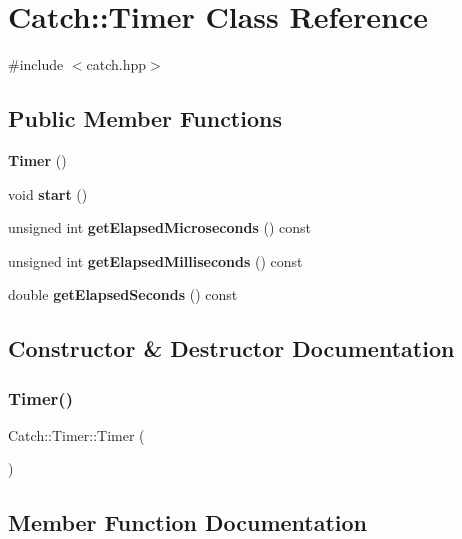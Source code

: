 \section{Catch\+:\+:Timer Class Reference}
\label{class_catch_1_1_timer}


{\ttfamily \#include $<$catch.\+hpp$>$}

\subsection*{Public Member Functions}
\begin{DoxyCompactItemize}
\item 
\textbf{ Timer} ()
\item 
void \textbf{ start} ()
\item 
unsigned int \textbf{ get\+Elapsed\+Microseconds} () const
\item 
unsigned int \textbf{ get\+Elapsed\+Milliseconds} () const
\item 
double \textbf{ get\+Elapsed\+Seconds} () const
\end{DoxyCompactItemize}


\subsection{Constructor \& Destructor Documentation}
\mbox{\label{class_catch_1_1_timer_af09b7cd7a40af71f4704262afb31558a}} 
\subsubsection{Timer()}
{\footnotesize\ttfamily Catch\+::\+Timer\+::\+Timer (\begin{DoxyParamCaption}{ }\end{DoxyParamCaption})\hspace{0.3cm}{\ttfamily [inline]}}



\subsection{Member Function Documentation}
\mbox{\label{class_catch_1_1_timer_af592ca4a9d340b9855732e4af777eaf0}} 
